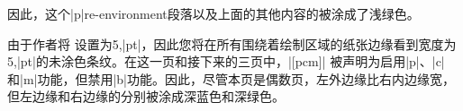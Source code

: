 
因此，这个|p|re-environment段落以及上面的其他内容的\bground{}被涂成了浅绿色。



由于作者将 \Uidx{\!\pagerim!} 设置为5,|pt|，因此您将在所有围绕着绘制区域的纸张边缘看到宽度为5,|pt|的未涂色条纹。在这一页和接下来的三页中，\Uidx{\!\twosided!}|[pcm]| 被声明为启用|p|、|c|和|m|功能，但禁用|b|功能。因此，尽管本页\pageref{sec:bgpaint}是偶数页，左外边缘比右内边缘宽，但左边缘和右边缘的\bground{}分别被涂成深蓝色和深绿色。

